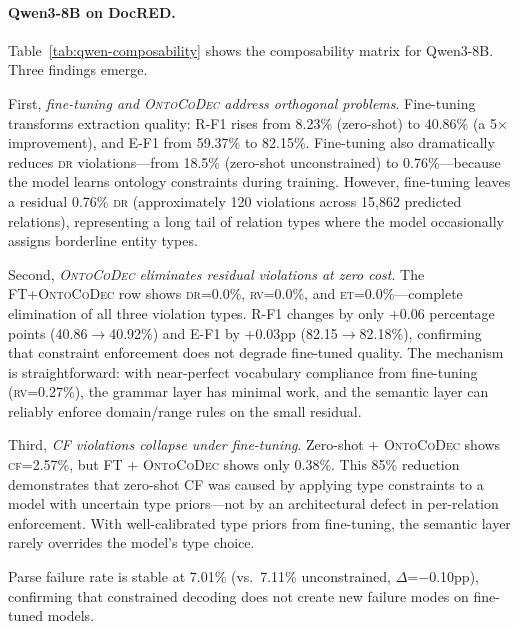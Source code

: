 \documentclass[11pt,a4paper]{article}
\newcommand{\sys}{\textsc{OntoCoDec}}
\newcommand{\DR}{\textsc{dr}}
\newcommand{\RV}{\textsc{rv}}
\newcommand{\ET}{\textsc{et}}
\newcommand{\CF}{\textsc{cf}}
\begin{document}
\paragraph{Qwen3-8B on DocRED.}
Table~\ref{tab:qwen-composability} shows the composability matrix for Qwen3-8B. Three findings emerge.

First, \emph{fine-tuning and \sys{} address orthogonal problems}. Fine-tuning transforms extraction quality: R-F1 rises from 8.23\% (zero-shot) to 40.86\% (a 5$\times$ improvement), and E-F1 from 59.37\% to 82.15\%. Fine-tuning also dramatically reduces \DR{} violations---from 18.5\% (zero-shot unconstrained) to 0.76\%---because the model learns ontology constraints during training. However, fine-tuning leaves a residual 0.76\% \DR{} (approximately 120 violations across 15,862 predicted relations), representing a long tail of relation types where the model occasionally assigns borderline entity types.

Second, \emph{\sys{} eliminates residual violations at zero cost}. The FT+\sys{} row shows \DR{}=0.0\%, \RV{}=0.0\%, and \ET{}=0.0\%---complete elimination of all three violation types. R-F1 changes by only +0.06 percentage points (40.86$\to$40.92\%) and E-F1 by +0.03pp (82.15$\to$82.18\%), confirming that constraint enforcement does not degrade fine-tuned quality. The mechanism is straightforward: with near-perfect vocabulary compliance from fine-tuning (\RV{}=0.27\%), the grammar layer has minimal work, and the semantic layer can reliably enforce domain/range rules on the small residual.

Third, \emph{CF violations collapse under fine-tuning}. Zero-shot + \sys{} shows \CF{}=2.57\%, but FT + \sys{} shows only 0.38\%. This 85\% reduction demonstrates that zero-shot CF was caused by applying type constraints to a model with uncertain type priors---not by an architectural defect in per-relation enforcement. With well-calibrated type priors from fine-tuning, the semantic layer rarely overrides the model's type choice.

Parse failure rate is stable at 7.01\% (vs.\ 7.11\% unconstrained, $\Delta$=$-$0.10pp), confirming that constrained decoding does not create new failure modes on fine-tuned models.
\end{document}
